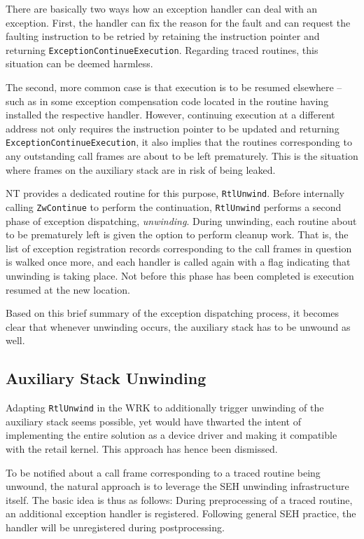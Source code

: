 There are basically two ways how an exception handler can deal with an exception. First, 
the handler can fix the reason for the fault and can request the faulting 
instruction to be retried by retaining the instruction pointer and returning
\verb|ExceptionContinueExecution|. Regarding traced routines, this situation can be 
deemed harmless.

The second, more common case is that execution is to be resumed elsewhere -- such as
in some exception compensation code located in the routine having installed the 
respective handler. However, continuing execution at a different address not
only requires the instruction pointer to be updated and returning 
\verb|ExceptionContinueExecution|, it also implies that the routines
corresponding to any outstanding call frames are about to be left prematurely. This is the 
situation where frames on the auxiliary stack are in risk of being leaked.

NT provides a dedicated routine for this purpose, \verb|RtlUnwind|. Before internally
calling \verb|ZwContinue| to perform the continuation, \verb|RtlUnwind| performs
a second phase of exception dispatching, \emph{unwinding}. During unwinding, each
routine about to be prematurely left is given the option to perform cleanup
work. That is, the list of exception registration records corresponding to the call 
frames in question is walked once more, and each handler is called again with a 
flag indicating that unwinding is taking place. Not before this phase has been 
completed is execution resumed at the new location.

Based on this brief summary of the exception dispatching process, it becomes clear
that whenever unwinding occurs, the auxiliary stack has to be unwound as well.

\subsection{Auxiliary Stack Unwinding}
\label{sec:Unwinding}
Adapting \verb|RtlUnwind| in the WRK to additionally trigger unwinding of the 
auxiliary stack seems possible, yet would have thwarted the intent 
of implementing the entire solution as a device driver and making it compatible
with the retail kernel. This approach has hence been dismissed.

To be notified about a call frame corresponding to a traced routine being unwound,
the natural approach is to leverage the SEH unwinding infrastructure itself. 
The basic idea is thus as follows: During preprocessing of a traced routine, an
additional exception handler is registered. Following general SEH practice, the
handler will be unregistered during postprocessing.

